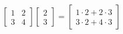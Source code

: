 \documentclass[preview]{standalone}
\begin{document}
\begin{align*}
\begin{bmatrix} 1 & 2 \\ 3 & 4 \end{bmatrix} \begin{bmatrix} 2 \\ 3 \end{bmatrix} = \begin{bmatrix} 1\cdot2 + 2\cdot3 \\ 3\cdot2 + 4\cdot3 \end{bmatrix}
\end{align*}
\end{document}
